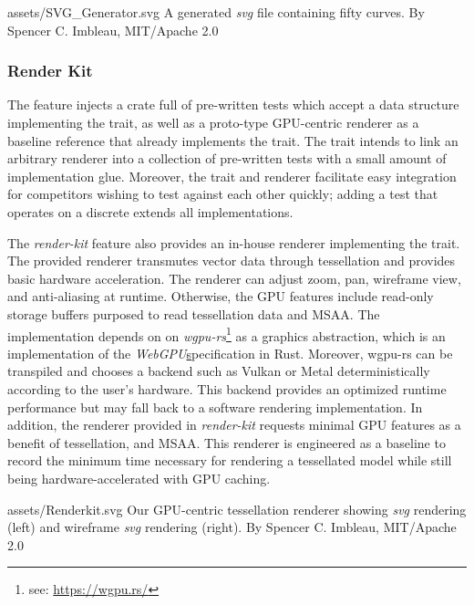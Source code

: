 \svg
{assets/SVG_Generator.svg}
{A generated \textit{svg} file containing fifty curves.}
{By Spencer C. Imbleau, MIT/Apache 2.0}

\subsubsection{Render Kit}\label{sec:render-kit}
The  feature injects a crate full of pre-written tests which accept a data structure implementing the  trait, as well as a proto-type GPU-centric renderer as a baseline reference that already implements the  trait. The  trait intends to link an arbitrary renderer into a collection of pre-written tests with a small amount of implementation glue. Moreover, the trait and renderer facilitate easy integration for competitors wishing to test against each other quickly; adding a test that operates on a discrete  extends all implementations.\medskip

The \textit{render-kit} feature also provides an in-house renderer implementing the  trait. The provided renderer transmutes vector data through tessellation and provides basic hardware acceleration. The renderer can adjust zoom, pan, wireframe view, and anti-aliasing at runtime. Otherwise, the GPU features include read-only storage buffers purposed to read tessellation data and MSAA. The implementation depends on on \textit{wgpu-rs}\footnote{see: \href{https://wgpu.rs/}{https://wgpu.rs/}} as a graphics abstraction, which is an implementation of the \textit{WebGPU}\href{https://www.w3.org/community/gpu/} specification in Rust. Moreover, wgpu-rs can be transpiled and chooses a backend such as Vulkan or Metal deterministically according to the user's hardware. This backend provides an optimized runtime performance but may fall back to a software rendering implementation. In addition, the renderer provided in \textit{render-kit} requests minimal GPU features as a benefit of tessellation, and MSAA. This renderer is engineered as a baseline to record the minimum time necessary for rendering a tessellated model while still being hardware-accelerated with GPU caching.\medskip

\widesvg
{assets/Renderkit.svg}
{Our  GPU-centric tessellation renderer showing \textit{svg} rendering (left) and wireframe \textit{svg} rendering (right).}
{By Spencer C. Imbleau, MIT/Apache 2.0}

